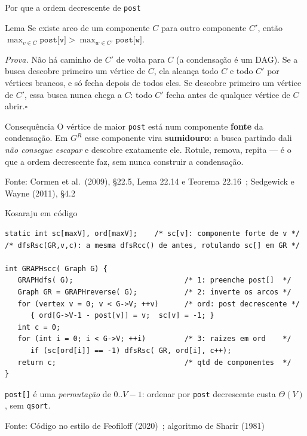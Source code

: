\documentclass[aspectratio=169]{beamer}
\newcommand{\fonte}[1]{\vfill{\tiny\color{gray!60!black}Fonte: #1\par}}
\begin{document}
\begin{frame}{Por que a ordem decrescente de \texttt{post}}
  \begin{block}{Lema}
    {\small Se existe arco de um componente $C$ para outro componente $C'$,
    então $\max_{v \in C} \texttt{post[v]} > \max_{w \in C'} \texttt{post[w]}$.}
  \end{block}
  {\scriptsize
  \emph{Prova.} Não há caminho de $C'$ de volta para $C$ (a condensação é um
  DAG). Se a busca descobre primeiro um vértice de $C$, ela alcança todo $C$ e
  todo $C'$ por vértices brancos, e só fecha depois de todos eles. Se descobre
  primeiro um vértice de $C'$, essa busca nunca chega a $C$: todo $C'$ fecha
  antes de qualquer vértice de $C$ abrir.\hfill$\square$}
  \begin{exampleblock}{Consequência}
    {\scriptsize O vértice de maior \texttt{post} está num componente
    \textbf{fonte} da condensação. Em $G^R$ esse componente vira
    \textbf{sumidouro}: a busca partindo dali \emph{não consegue escapar} e
    descobre exatamente ele. Rotule, remova, repita --- é o que a ordem
    decrescente faz, sem nunca construir a condensação.}
  \end{exampleblock}
  \fonte{Cormen et al.\ (2009), \S 22.5, Lema 22.14 e Teorema 22.16~\cite{cormen2009introduction}; Sedgewick e Wayne (2011), \S 4.2~\cite{sedgewick2011algorithms}}
\end{frame}

\begin{frame}[fragile]{Kosaraju em código}
\begin{lstlisting}
static int sc[maxV], ord[maxV];    /* sc[v]: componente forte de v */
/* dfsRsc(GR,v,c): a mesma dfsRcc() de antes, rotulando sc[] em GR */

int GRAPHscc( Graph G) {
   GRAPHdfs( G);                          /* 1: preenche post[]  */
   Graph GR = GRAPHreverse( G);           /* 2: inverte os arcos */
   for (vertex v = 0; v < G->V; ++v)      /* ord: post decrescente */
      { ord[G->V-1 - post[v]] = v;  sc[v] = -1; }
   int c = 0;
   for (int i = 0; i < G->V; ++i)         /* 3: raizes em ord    */
      if (sc[ord[i]] == -1) dfsRsc( GR, ord[i], c++);
   return c;                              /* qtd de componentes  */
}
\end{lstlisting}
  {\scriptsize \texttt{post[]} é uma \emph{permutação} de $0..V\!-\!1$: ordenar
  por \texttt{post} decrescente custa $\Theta(V)$, sem \texttt{qsort}.}
  \fonte{Código no estilo de Feofiloff (2020)~\cite{feofiloff2020algoritmos}; algoritmo de Sharir (1981)~\cite{sharir1981strong}}
\end{frame}
\end{document}
